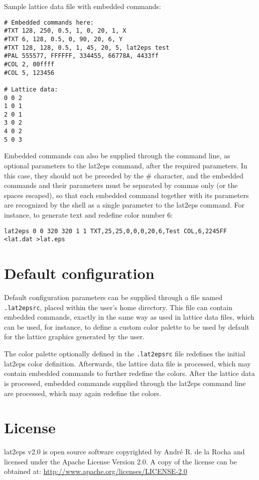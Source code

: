 \documentclass[a4paper]{article}
\begin{document}
Sample lattice data file with embedded commands:
\bigbreak

\begin{lstlisting}[frame=single]
# Embedded commands here:
#TXT 128, 250, 0.5, 1, 0, 20, 1, X
#TXT 6, 128, 0.5, 0, 90, 20, 6, Y
#TXT 128, 128, 0.5, 1, 45, 20, 5, lat2eps test
#PAL 555577, FFFFFF, 334455, 66778A, 4433ff
#COL 2, 00ffff
#COL 5, 123456

# Lattice data:
0 0 2
1 0 1
2 0 1
3 0 2
4 0 2
5 0 3
\end{lstlisting}

\bigbreak

Embedded commands can also be supplied through the command line, as optional parameters to the lat2eps command, after the required parameters. In this case, they should not be preceded by the \# character, and the embedded commands and their parameters must be separated by commas only (or the spaces escaped), so that each embedded command together with its parameters are recognized by the shell as a single parameter to the lat2eps command. For instance, to generate text and redefine color number 6:
\bigbreak

\texttt{lat2eps 0 0 320 320 1 1 TXT,25,25,0,0,0,20,6,Test COL,6,2245FF <lat.dat >lat.eps}
\bigbreak


\section{Default configuration}

Default configuration parameters can be supplied through a file named \texttt{.lat2epsrc}, placed within the user's home directory. This file can contain embedded commands, exactly in the same way as used in lattice data files, which can be used, for instance, to define a custom color palette to be used by default for the lattice graphics generated by the user.
\bigbreak

The color palette optionally defined in the \texttt{.lat2epsrc} file redefines the initial lat2eps color definition. Afterwards, the lattice data file is processed, which may contain embedded commands to further redefine the colors. After the lattice data is processed, embedded commands supplied through the lat2eps command line are processed, which may again redefine the colors.
\bigbreak


\section{License}

lat2eps v2.0 is open source software copyrighted by André R. de la Rocha and licensed under the Apache License Version 2.0. A copy of the license can be obtained at: \url{http://www.apache.org/licenses/LICENSE-2.0}
\end{document}
